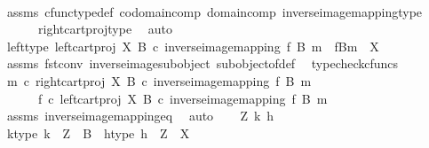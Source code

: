 \begin{isabellebody}
\ \ \ \ \isamarkupfalse%
\ assms\ cfunc{\isacharunderscore}{\kern0pt}type{\isacharunderscore}{\kern0pt}def\ codomain{\isacharunderscore}{\kern0pt}comp\ domain{\isacharunderscore}{\kern0pt}comp\ inverse{\isacharunderscore}{\kern0pt}image{\isacharunderscore}{\kern0pt}mapping{\isacharunderscore}{\kern0pt}type\isanewline
\ \ \ \ \ \ right{\isacharunderscore}{\kern0pt}cart{\isacharunderscore}{\kern0pt}proj{\isacharunderscore}{\kern0pt}type\ \isamarkupfalse%
\ auto\isanewline
\ \ \isamarkupfalse%
\ left{\isacharunderscore}{\kern0pt}type{\isacharcolon}{\kern0pt}\ {\isachardoublequoteopen}left{\isacharunderscore}{\kern0pt}cart{\isacharunderscore}{\kern0pt}proj\ X\ B\ {\isasymcirc}\isactrlsub c\ inverse{\isacharunderscore}{\kern0pt}image{\isacharunderscore}{\kern0pt}mapping\ f\ B\ m\ {\isacharcolon}{\kern0pt}\ f\isactrlsup {\isacharminus}{\kern0pt}B{\isasymrparr}\isactrlbsub m\isactrlesub \ {\isasymrightarrow}\ X{\isachardoublequoteclose}\isanewline
\ \ \ \ \isamarkupfalse%
\ assms\ fst{\isacharunderscore}{\kern0pt}conv\ inverse{\isacharunderscore}{\kern0pt}image{\isacharunderscore}{\kern0pt}subobject\ subobject{\isacharunderscore}{\kern0pt}of{\isacharunderscore}{\kern0pt}def\ \isamarkupfalse%
\ {\isacharparenleft}{\kern0pt}typecheck{\isacharunderscore}{\kern0pt}cfuncs{\isacharparenright}{\kern0pt}\isanewline
\isanewline
\ \ \isamarkupfalse%
\ {\isachardoublequoteopen}m\ {\isasymcirc}\isactrlsub c\ right{\isacharunderscore}{\kern0pt}cart{\isacharunderscore}{\kern0pt}proj\ X\ B\ {\isasymcirc}\isactrlsub c\ inverse{\isacharunderscore}{\kern0pt}image{\isacharunderscore}{\kern0pt}mapping\ f\ B\ m\ {\isacharequal}{\kern0pt}\isanewline
\ \ \ \ \ \ f\ {\isasymcirc}\isactrlsub c\ left{\isacharunderscore}{\kern0pt}cart{\isacharunderscore}{\kern0pt}proj\ X\ B\ {\isasymcirc}\isactrlsub c\ inverse{\isacharunderscore}{\kern0pt}image{\isacharunderscore}{\kern0pt}mapping\ f\ B\ m{\isachardoublequoteclose}\isanewline
\ \ \ \ \isamarkupfalse%
\ assms\ inverse{\isacharunderscore}{\kern0pt}image{\isacharunderscore}{\kern0pt}mapping{\isacharunderscore}{\kern0pt}eq\ \isamarkupfalse%
\ auto\isanewline
{}\isamarkupfalse%
\isanewline
\ \ \isamarkupfalse%
\ Z\ k\ h\isanewline
\ \ \isamarkupfalse%
\ k{\isacharunderscore}{\kern0pt}type{\isacharcolon}{\kern0pt}\ {\isachardoublequoteopen}k\ {\isacharcolon}{\kern0pt}\ Z\ {\isasymrightarrow}\ B{\isachardoublequoteclose}\ \ h{\isacharunderscore}{\kern0pt}type{\isacharcolon}{\kern0pt}\ {\isachardoublequoteopen}h\ {\isacharcolon}{\kern0pt}\ Z\ {\isasymrightarrow}\ X{\isachardoublequoteclose}\isanewline

\end{isabellebody}
